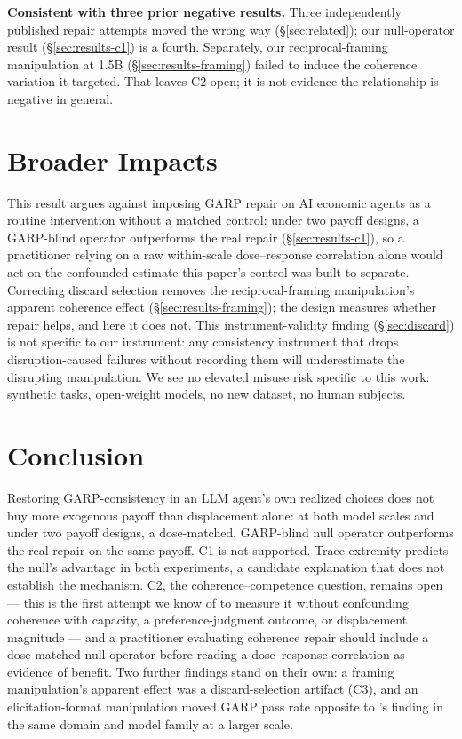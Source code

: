 \documentclass{article}
\begin{document}
\textbf{Consistent with three prior negative results.} Three independently published repair
attempts moved the wrong way (\S\ref{sec:related}); our null-operator result
(\S\ref{sec:results-c1}) is a fourth. Separately, our reciprocal-framing manipulation at 1.5B
(\S\ref{sec:results-framing}) failed to induce the coherence variation it targeted. That leaves
C2 open; it is not evidence the relationship is negative in general.

\section{Broader Impacts}

This result argues against imposing GARP repair on AI economic agents as a routine intervention
without a matched control: under two payoff designs, a GARP-blind operator outperforms the real
repair (\S\ref{sec:results-c1}), so a practitioner relying on a raw within-scale dose--response
correlation alone would act on the confounded estimate this paper's control was built to
separate. Correcting discard selection removes the reciprocal-framing manipulation's apparent
coherence effect (\S\ref{sec:results-framing}); the design measures whether repair helps, and
here it does not. This instrument-validity finding (\S\ref{sec:discard}) is not specific to our
instrument: any consistency instrument that drops disruption-caused failures without recording
them will underestimate the disrupting manipulation. We see no elevated misuse risk specific to
this work: synthetic tasks, open-weight models, no new dataset, no human subjects.

\section{Conclusion}
\label{sec:conclusion}

Restoring GARP-consistency in an LLM agent's own realized choices does not buy more exogenous
payoff than displacement alone: at both model scales and under two payoff designs, a
dose-matched, GARP-blind null operator outperforms the real repair on the same payoff. C1 is not
supported. Trace extremity predicts the null's advantage in both experiments, a candidate
explanation that does not establish the mechanism. C2, the coherence--competence question,
remains open --- this is the first attempt we know of to measure it without confounding coherence
with capacity, a preference-judgment outcome, or displacement magnitude --- and a practitioner
evaluating coherence repair should include a dose-matched null operator before reading a
dose--response correlation as evidence of benefit. Two further findings stand on their own: a
framing manipulation's apparent effect was a discard-selection artifact (C3), and an
elicitation-format manipulation moved GARP pass rate opposite to \citet{wang2025tactics}'s
finding in the same domain and model family at a larger scale.
\end{document}
